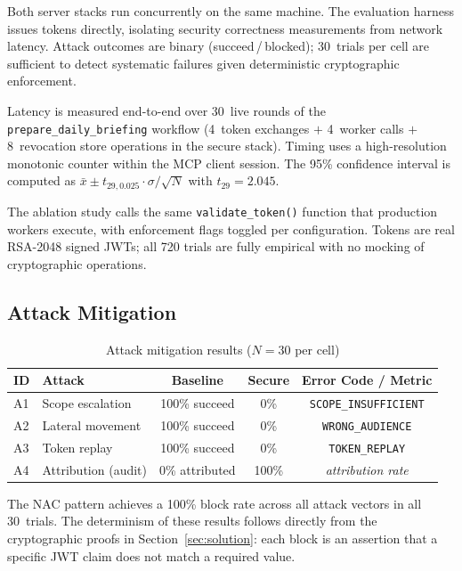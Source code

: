 \documentclass[journal]{IEEEtran}
\begin{document}
Both server stacks run concurrently on the same machine. The evaluation harness
issues tokens directly, isolating security correctness measurements from network
latency. Attack outcomes are binary (succeed\,/\,blocked); 30~trials per cell
are sufficient to detect systematic failures given deterministic cryptographic
enforcement.

Latency is measured end-to-end over 30~live rounds of the
\texttt{prepare\_daily\_briefing} workflow (4~token exchanges $+$ 4~worker
calls $+$ 8~revocation store operations in the secure stack). Timing uses a
high-resolution monotonic counter within the MCP client session. The 95\%
confidence interval is computed as
$\bar{x} \pm t_{29,0.025} \cdot \sigma/\sqrt{N}$ with $t_{29} = 2.045$.

The ablation study calls the same \texttt{validate\_token()} function that
production workers execute, with enforcement flags toggled per configuration.
Tokens are real RSA-2048 signed JWTs; all 720 trials are fully empirical with
no mocking of cryptographic operations.

\subsection{Attack Mitigation}

\begin{table}[h]
\caption{Attack mitigation results ($N=30$ per cell)}
\label{tab:attacks}
\centering
\footnotesize
\setlength{\tabcolsep}{4pt}
\begin{tabular}{llccc}
\toprule
\textbf{ID} & \textbf{Attack} & \textbf{Baseline} & \textbf{Secure} & \textbf{Error Code / Metric} \\
\midrule
A1 & Scope escalation    & 100\% succeed & 0\%  & \texttt{SCOPE\_INSUFFICIENT} \\
A2 & Lateral movement    & 100\% succeed & 0\%  & \texttt{WRONG\_AUDIENCE} \\
A3 & Token replay        & 100\% succeed & 0\%  & \texttt{TOKEN\_REPLAY} \\
A4 & Attribution (audit) & 0\% attributed & 100\% & \textit{attribution rate} \\
\bottomrule
\end{tabular}
\end{table}

The NAC pattern achieves a 100\% block rate across all attack vectors in all
30~trials. The determinism of these results follows directly from the
cryptographic proofs in Section~\ref{sec:solution}: each block is an assertion
that a specific JWT claim does not match a required value.
\end{document}
